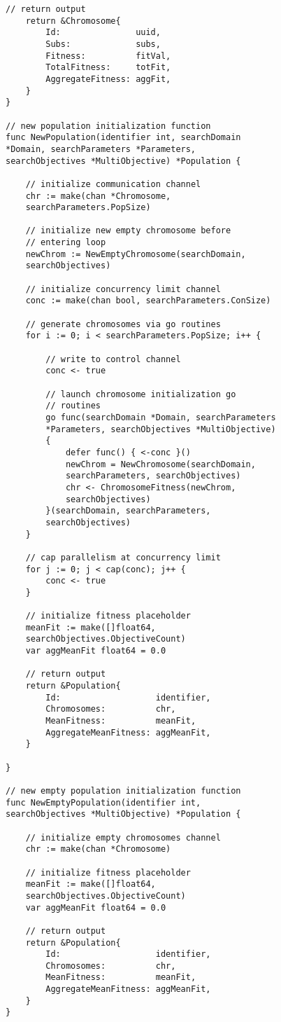 \begin{lstlisting}[basicstyle=\small]
	// return output
	return &Chromosome{
		Id:               uuid,
		Subs:             subs,
		Fitness:          fitVal,
		TotalFitness:     totFit,
		AggregateFitness: aggFit,
	}
}

// new population initialization function
func NewPopulation(identifier int, searchDomain 
*Domain, searchParameters *Parameters, 
searchObjectives *MultiObjective) *Population {

	// initialize communication channel
	chr := make(chan *Chromosome, 
	searchParameters.PopSize)

	// initialize new empty chromosome before 
	// entering loop
	newChrom := NewEmptyChromosome(searchDomain, 
	searchObjectives)

	// initialize concurrency limit channel
	conc := make(chan bool, searchParameters.ConSize)

	// generate chromosomes via go routines
	for i := 0; i < searchParameters.PopSize; i++ {

		// write to control channel
		conc <- true

		// launch chromosome initialization go 
		// routines
		go func(searchDomain *Domain, searchParameters 
		*Parameters, searchObjectives *MultiObjective) 
		{
			defer func() { <-conc }()
			newChrom = NewChromosome(searchDomain, 
			searchParameters, searchObjectives)
			chr <- ChromosomeFitness(newChrom, 
			searchObjectives)
		}(searchDomain, searchParameters, 
		searchObjectives)
	}

	// cap parallelism at concurrency limit
	for j := 0; j < cap(conc); j++ {
		conc <- true
	}

	// initialize fitness placeholder
	meanFit := make([]float64, 
	searchObjectives.ObjectiveCount)
	var aggMeanFit float64 = 0.0

	// return output
	return &Population{
		Id:                   identifier,
		Chromosomes:          chr,
		MeanFitness:          meanFit,
		AggregateMeanFitness: aggMeanFit,
	}

}

// new empty population initialization function
func NewEmptyPopulation(identifier int, 
searchObjectives *MultiObjective) *Population {

	// initialize empty chromosomes channel
	chr := make(chan *Chromosome)

	// initialize fitness placeholder
	meanFit := make([]float64, 
	searchObjectives.ObjectiveCount)
	var aggMeanFit float64 = 0.0

	// return output
	return &Population{
		Id:                   identifier,
		Chromosomes:          chr,
		MeanFitness:          meanFit,
		AggregateMeanFitness: aggMeanFit,
	}
}


\end{lstlisting}
